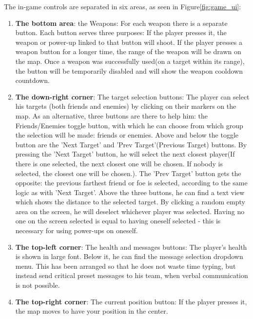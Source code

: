 The in-game controls are separated in six areas, as seen in Figure\ref{fig:game_ui}:

\begin{enumerate}
  \item \textbf{The bottom area}: the Weapons: For each weapon there is a
  separate button. Each button serves three purposes: If the player presses it,
  the weapon or power-up linked to that button will shoot. If the player presses
  a weapon button for a longer time, the range of the weapon will be drawn on
  the map. Once a weapon was successfully used(on a target within its range),
  the button will be temporarily disabled and will show the weapon cooldown
  countdown.
  
  \item \textbf{The down-right corner}: The target selection buttons: The player
  can select his targets (both friends and enemies) by clicking on their
  markers on the map. As an alternative, three buttons are there to help him:
  the Friends/Enemies toggle button, with which he can choose from which
  group the selection will be made: friends or enemies. Above and below the
  toggle button are the 'Next Target' and 'Prev Target'(Previous Target)
  buttons. By pressing the 'Next Target' button, he will select the next closest
  player(If there is one selected, the next closest one will be chosen. If
  nobody is selected, the closest one will be chosen.). The 'Prev Target' button
  gets the opposite: the previous farthest friend or foe is selected, according
  to the same logic as with 'Next Target'. Above the three buttons, he can find
  a text view which shows the distance to the selected target. By clicking a
  random empty area on the screen, he will deselect whichever player was
  selected. Having no one on the screen selected is equal to having oneself
  selected - this is necessary for using power-ups on oneself.
  
  \item \textbf{The top-left corner}: The health and messages buttons: The
  player's health is shown in large font. Below it, he can find the message
  selection dropdown menu. This has been arranged so that he does not waste time
  typing, but instead send critical preset messages to his team, when verbal
  communication is not possible.
  
  \item \textbf{The top-right corner}: The current position button: If the
  player presses it, the map moves to have your position in the center.
  

\end{enumerate}
